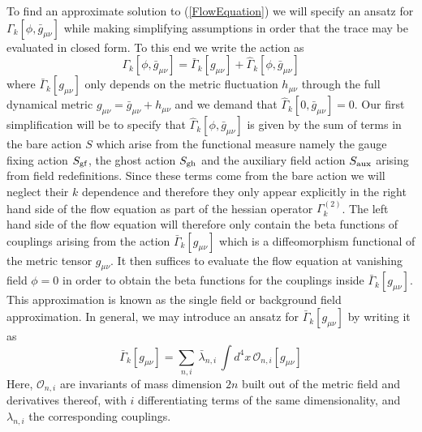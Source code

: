 \documentclass[notitlepage,eqsecnum,bm,amsmath,preprintnumbers,superscriptaddress,nofootinbib,aps,11pt]{revtex4-1}
\def\eq#1{(\ref{#1})}
\def\beq{\begin{equation}}
\def\eeq{\end{equation}}
\begin{document}
To find an approximate solution to \eq{FlowEquation} we will specify an ansatz for  $\Gamma_k[\phi,\bar{g}_{\mu\nu}]$ while making simplifying assumptions in order that the trace may be evaluated in closed form. To this end we write the action as
\beq
\Gamma_k[\phi,\bar{g}_{\mu\nu}] = \bar{\Gamma}_k[g_{\mu\nu}] + \hat{\Gamma}_k[\phi ,\bar{g}_{\mu\nu}]
\eeq
where $\bar{\Gamma}_k[g_{\mu\nu}]$ only depends on the metric fluctuation $h_{\mu\nu}$ through the full dynamical metric $g_{\mu\nu} = \bar{g}_{\mu\nu} + h_{\mu\nu}$ and we demand that $\hat{\Gamma}_k[0 ,\bar{g}_{\mu\nu}]= 0$. Our first simplification will be to specify that $\hat{\Gamma}_k[\phi ,\bar{g}_{\mu\nu}]$ is given by the sum of terms in the bare action $S$ which arise from the functional measure namely the gauge fixing action $S_{\rm gf}$, the ghost action $S_{\rm gh}$ and the auxiliary field action $S_{\rm aux}$ arising from field redefinitions. Since these terms come from the bare action we will neglect their $k$ dependence and therefore they only appear explicitly in the right hand side of the flow equation as part of the hessian operator  $\Gamma^{(2)}_k$. The left hand side of the flow equation will therefore only contain the beta functions of couplings arising from the action  $\bar{\Gamma}_k[g_{\mu\nu}]$ which is a diffeomorphism functional of the metric tensor $g_{\mu\nu}$. It then suffices to evaluate the flow equation at vanishing field $\phi = 0$ in order to obtain the beta functions for the couplings inside $\bar{\Gamma}_k[g_{\mu\nu}]$. This approximation is known as the single field or background field approximation.
In general, we may introduce an ansatz for $\bar{\Gamma}_k[g_{\mu\nu}]$  by writing it as
\beq\label{Ansatz}
\bar\Gamma_k[g_{\mu\nu}]  = \sum_{n,i}\,\bar\lambda_{n,i}\,\int d^4x\, \mathcal{O}_{n,i}[g_{\mu\nu}] 
\eeq
Here, $\mathcal{O}_{n,i}$ are invariants of  mass dimension $2n$ built out of the metric field and derivatives thereof,
with $i$ differentiating terms of the same dimensionality,  and $\lambda_{n,i}$ the corresponding couplings.  
\end{document}
